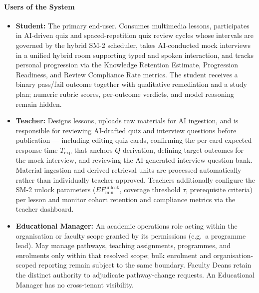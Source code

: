 \paragraph{Users of the System}
\begin{itemize}
    \item \textbf{Student:} The primary end-user. Consumes
    multimedia lessons, participates in AI-driven quiz and spaced-repetition quiz
    review cycles whose intervals are governed by the hybrid SM-2
    scheduler, takes AI-conducted mock interviews in a unified hybrid
    room supporting typed and spoken interaction, and tracks personal
    progression via the Knowledge Retention Estimate, Progression
    Readiness, and Review Compliance Rate metrics. The student receives
    a binary pass/fail outcome together with qualitative remediation and
    a study plan; numeric rubric scores, per-outcome verdicts, and model
    reasoning remain hidden.
 
    \item \textbf{Teacher:} Designs lessons, uploads
    raw materials for AI ingestion, and is
    responsible for reviewing AI-drafted quiz and interview questions
    before publication --- including editing quiz cards, confirming the
    per-card expected response time $T_{\text{exp}}$ that anchors $Q$
    derivation, defining target outcomes for the mock interview, and
    reviewing the AI-generated interview question bank. Material
    ingestion and derived retrieval units are processed automatically
    rather than individually teacher-approved. Teachers additionally
    configure the SM-2 unlock
    parameters ($EF_{\min}^{\text{unlock}}$, coverage threshold
    $\tau$, prerequisite criteria) per lesson and monitor cohort
    retention and compliance metrics via the teacher dashboard.
 
    \item \textbf{Educational Manager:} An academic operations role
    acting within the organisation or faculty scope granted by its
    permissions (e.g.\ a programme lead). May manage pathways,
    teaching assignments, programmes, and enrolments only within that
    resolved scope; bulk enrolment and organisation-scoped reporting
    remain subject to the same boundary. Faculty Deans retain the
    distinct authority to adjudicate pathway-change requests. An
    Educational Manager has no cross-tenant visibility.


\end{itemize}

